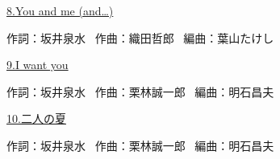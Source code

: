 \small{\hyperlink{4_7}{8.You and me (and…)}}

\tiny{作詞：坂井泉水 \ 作曲：織田哲郎 \ 編曲：葉山たけし}

\small{\hyperlink{4_8}{9.I want you}}

\tiny{作詞：坂井泉水 \ 作曲：栗林誠一郎 \ 編曲：明石昌夫}

\small{\hyperlink{4_9}{10.二人の夏}}

\tiny{作詞：坂井泉水 \ 作曲：栗林誠一郎 \ 編曲：明石昌夫}

\small{ \ }

\tiny{ \ }

\small{ \ }

\tiny{ \ }

\small{ \ }

\tiny{ \ }

\clearpage
